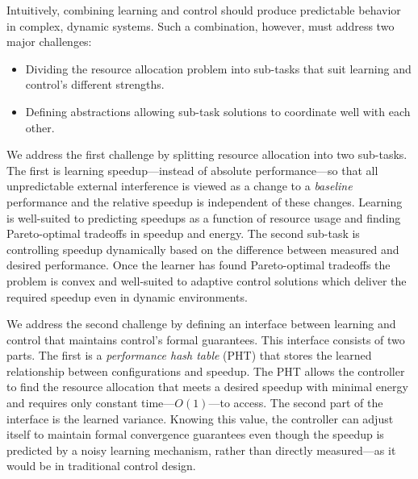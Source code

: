 Intuitively, combining learning and control should produce predictable
behavior in complex, dynamic systems.  Such a combination, however,
must address two major challenges:
\begin{itemize}[leftmargin=1em]
\item Dividing the resource allocation problem into sub-tasks that
  suit learning and control's different strengths.
\item Defining abstractions allowing sub-task solutions to coordinate
  well with each other.
\end{itemize}

We address the first challenge by splitting resource allocation into
two sub-tasks.  The first is learning speedup---instead of absolute
performance---so that all unpredictable external interference is
viewed as a change to a \emph{baseline} performance and the relative
speedup is independent of these changes.  Learning is well-suited to
predicting speedups as a function of resource usage and finding
Pareto-optimal tradeoffs in speedup and energy.  The second sub-task
is controlling speedup dynamically based on the difference between
measured and desired performance.  Once the learner has found
Pareto-optimal tradeoffs the problem is convex and well-suited to
adaptive control solutions which deliver the required speedup even in
dynamic environments.

We address the second challenge by defining an interface between
learning and control that maintains control's formal guarantees.  This
interface consists of two parts.  The first is a \emph{performance
  hash table} (PHT) that stores the learned relationship between
configurations and speedup.  The PHT allows the controller to find the
resource allocation that meets a desired speedup with minimal energy
and requires only constant time---$O(1)$---to access.  The second part
of the interface is the learned variance.  Knowing this value, the
controller can adjust itself to maintain formal convergence guarantees
even though the speedup is predicted by a noisy learning mechanism,
rather than directly measured---as it would be in traditional control
design.

